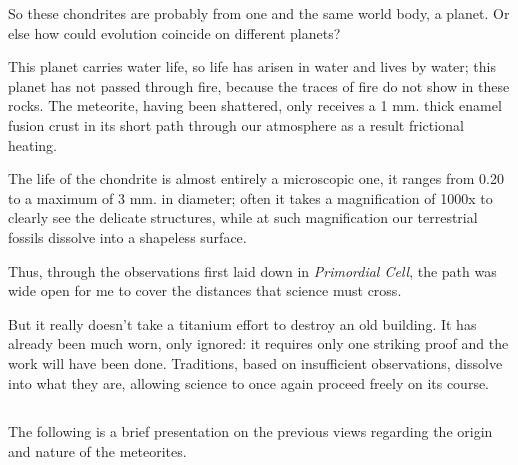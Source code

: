 \documentclass[a4paper, 12pt, oneside]{article}
\begin{document}
So these chondrites are probably from one and the same world body, a planet. Or else how could evolution coincide on different planets?

This planet carries water life, so life has arisen in water and lives by water; this planet has not passed through fire, because the traces of fire do not show in these rocks. The meteorite, having been shattered, only receives a 1 mm. thick enamel fusion crust in its short path through our atmosphere as a result frictional heating.

The life of the chondrite is almost entirely a microscopic one, it ranges from 0.20 to a maximum of 3 mm. in diameter; often it takes a magnification of 1000x to clearly see the delicate structures, while at such magnification our terrestrial fossils dissolve into a shapeless surface.

Thus, through the observations first laid down in \emph{Primordial Cell}, the path was wide open for me to cover the distances that science must cross.

But it really doesn't take a titanium effort to destroy an old building. It has already been much worn, only ignored: it requires only one striking proof and the work will have been done. Traditions, based on insufficient observations, dissolve into what they are, allowing science to once again proceed freely on its course.
\clearpage
\subsection{}
\paragraph*{}
The following is a brief presentation on the previous views regarding the origin and nature of the meteorites.
\end{document}
